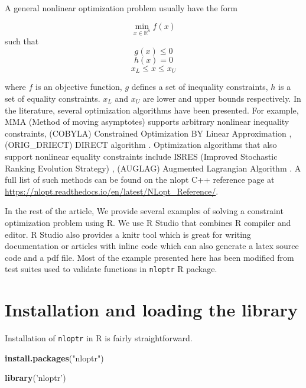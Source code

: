\documentclass[onecolumn]{article}
\newenvironment{Shaded}{\begin{snugshade}}{\end{snugshade}}
\newcommand{\KeywordTok}[1]{\textcolor[rgb]{0.13,0.29,0.53}{\textbf{#1}}}
\newcommand{\StringTok}[1]{\textcolor[rgb]{0.31,0.60,0.02}{#1}}
\newcommand{\NormalTok}[1]{#1}
\begin{document}
A general nonlinear optimization problem usually have the form

\[
\min_{x \in \mathbb{R}^n} f(x)
\] such that \[
g(x) \leq 0
\] \[
h(x) = 0
\] \[
x_L \leq x \leq x_U
\]

where \(f\) is an objective function, \(g\) defines a set of inequality
constraints, \(h\) is a set of equality constraints. \(x_L\) and \(x_U\)
are lower and upper bounds respectively. In the literature, several
optimization algorithms have been presented. For example, MMA (Method of
moving asymptotes) \citep{svanberg1987method} supports arbitrary
nonlinear inequality constraints, (COBYLA) Constrained Optimization BY
Linear Approximation \citep{powell1994direct}, (ORIG\_DRIECT) DIRECT
algorithm \citep{finkel2003direct}. Optimization algorithms that also
support nonlinear equality constraints include ISRES (Improved
Stochastic Ranking Evolution Strategy) \citep{runarsson2000stochastic},
(AUGLAG) Augmented Lagrangian Algorithm \citep{conn1991globally}. A full
list of such methods can be found on the nlopt C++ reference page at
\url{https://nlopt.readthedocs.io/en/latest/NLopt_Reference/}.

In the rest of the article, We provide several examples of solving a
constraint optimization problem using R. We use R Studio that combines R
compiler and editor. R Studio also provides a knitr tool which is great
for writing documentation or articles with inline code which can also
generate a latex source code and a pdf file. Most of the example
presented here has been modified from test suites used to validate
functions in \texttt{nloptr} R package.

\section{Installation and loading the
library}\label{installation-and-loading-the-library}

Installation of \texttt{nloptr} in R is fairly straightforward.

\begin{Shaded}
\begin{Highlighting}[]
\KeywordTok{install.packages}\NormalTok{(}\StringTok{"nloptr"}\NormalTok{)}
\end{Highlighting}
\end{Shaded}

\begin{Shaded}
\begin{Highlighting}[]
\KeywordTok{library}\NormalTok{(}\StringTok{'nloptr'}\NormalTok{)}
\end{Highlighting}
\end{Shaded}
\end{document}
